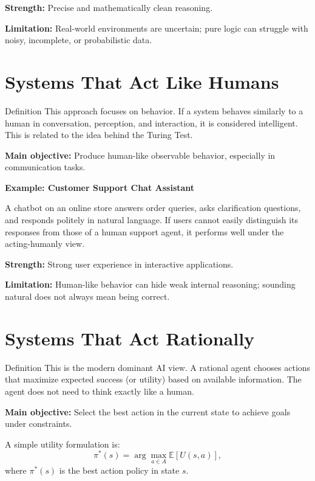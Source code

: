 \documentclass[12pt,a4paper]{article}
\begin{document}
\textbf{Strength:} Precise and mathematically clean reasoning.

\textbf{Limitation:} Real-world environments are uncertain; pure logic can struggle with noisy, incomplete, or probabilistic data.

\section{Systems That Act Like Humans}

\begin{typebox}{Definition}
This approach focuses on behavior.
If a system behaves similarly to a human in conversation, perception, and interaction, it is considered intelligent.
This is related to the idea behind the Turing Test.
\end{typebox}

\textbf{Main objective:} Produce human-like observable behavior, especially in communication tasks.

\begin{examplebox}
\textbf{Example: Customer Support Chat Assistant}

A chatbot on an online store answers order queries, asks clarification questions, and responds politely in natural language.
If users cannot easily distinguish its responses from those of a human support agent, it performs well under the acting-humanly view.
\end{examplebox}

\textbf{Strength:} Strong user experience in interactive applications.

\textbf{Limitation:} Human-like behavior can hide weak internal reasoning; sounding natural does not always mean being correct.

\section{Systems That Act Rationally}

\begin{typebox}{Definition}
This is the modern dominant AI view.
A rational agent chooses actions that maximize expected success (or utility) based on available information.
The agent does not need to think exactly like a human.
\end{typebox}

\textbf{Main objective:} Select the best action in the current state to achieve goals under constraints.

A simple utility formulation is:
\begin{equation}
\pi^*(s) = \arg\max_{a \in A} \mathbb{E}[U(s,a)],
\end{equation}
where $\pi^*(s)$ is the best action policy in state $s$.
\end{document}
